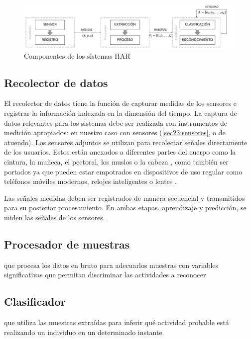 \begin{figure}[!tbph]
\centering{}\includegraphics[width=1\linewidth]{capitulo-4/graphics/diagrama_4_1}\caption{Componentes de los sistemas HAR}
\label{fig41:componentes-har}
\end{figure}


\subsection{Recolector de datos}

El recolector de datos tiene la función de capturar medidas de los
sensores e registrar la información indexada en la dimensión del tiempo.
La captura de datos relevantes para los sistemas  debe
ser realizada con instrumentos de medición apropiados: en nuestro
caso con sensores (\ref{sec23:sensores}, o de atuendo).
Los sensores adjuntos se utilizan para recolectar señales directamente
de los usuarios. Estos están anexados a diferentes partes del cuerpo
como la cintura, la muñeca, el pectoral, los muslos o la cabeza \cite{Bao2004},
como también ser portados ya que pueden estar empotrados en dispositivos
de uso regular como teléfonos móviles modernos, relojes inteligentes
o lentes \cite{LaraLabrador2012,Choudhury2008}.

Las señales medidas deben ser registrados de manera secuencial y transmitidos
para su posterior procesamiento. En ambas etapas, aprendizaje y predicción,
se miden las señales de los sensores.

\subsection{Procesador de muestras}

que procesa los datos en bruto para adecuarlos muestras con variables
significativas que permitan discriminar las actividades a reconocer

\subsection{Clasificador}

que utiliza las muestras extraídas para inferir qué actividad probable
está realizando un individuo en un determinado instante.

